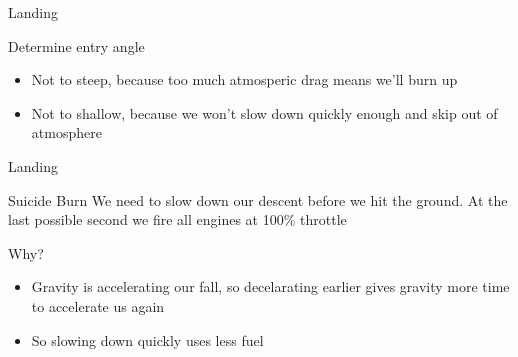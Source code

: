 {
%
\begin{frame}
\end{frame}
\begin{frame}[t]{Landing}
    \begin{block}{Determine entry angle}
        \begin{itemize}
            \item Not to steep, because too much atmosperic drag means we'll burn up
            \item Not to shallow, because we won't slow down quickly enough and skip out of atmosphere
        \end{itemize}
    \end{block}
\end{frame}
\begin{frame}[t]{Landing}
    \begin{block}{Suicide Burn}
        We need to slow down our descent before we hit the ground. At the last possible second we fire all engines at 100\% throttle
    \end{block}
    \begin{block}{Why?}
        \begin{itemize}
            \item Gravity is accelerating our fall, so decelarating earlier gives gravity more time to accelerate us again
            \item So slowing down quickly uses less fuel
        \end{itemize}
    \end{block}
\end{frame}
}
